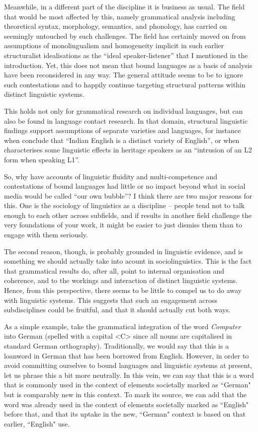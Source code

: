Meanwhile, in a different part of the discipline it is business as usual. The field that would be most affected by this, namely grammatical analysis including theoretical syntax, morphology, semantics, and phonology, has carried on seemingly untouched by such challenges. The field has certainly moved on from assumptions of monolingualism and homogeneity implicit in such earlier structuralist idealisations as the “ideal speaker-listener” that I mentioned in the introduction. Yet, this does not mean that bound languages as a basis of analysis have been reconsidered in any way. The general attitude seems to be to ignore such contestations and to happily continue targeting structural patterns within distinct linguistic systems.

This holds not only for grammatical research on individual languages, but can also be found in language contact research. In that domain, structural linguistic findings support assumptions of separate varieties and languages, for instance when \citet[2]{PagePutnam2020} conclude that “Indian English is a distinct variety of English”, or when \citet[8]{MacWhinney2019} characterises some linguistic effects in heritage speakers as an “intrusion of an L2 form when speaking L1”.

So, why have accounts of linguistic fluidity and multi-competence and contestations of bound languages had little or no impact beyond what in social media would be called “our own bubble”? I think there are two major reasons for this. One is the sociology of linguistics as a discipline –  people tend not to talk enough to each other across subfields, and if results in another field challenge the very foundations of your work, it might be easier to just dismiss them than to engage with them seriously.

The second reason, though, is probably grounded in linguistic evidence, and is something we should actually take into acount in sociolinguistics. This is the fact that grammatical results do, after all, point to internal organisation and coherence, and to the workings and interaction of distinct linguistic systems. Hence, from this perspective, there seems to be little to compel us to do away with linguistic systems. This suggests that such an engagement across subdisciplines could be fruitful, and that it should actually cut both ways.

As a simple example, take the grammatical integration of the word \textit{Computer} into German (spelled with a capital <C> since all nouns are capitalised in standard German orthography). Traditionally, we would say that this is a loanword in German that has been borrowed from English. However, in order to avoid committing ourselves to bound languages and linguistic systems at present, let us phrase this a bit more neutrally. In this vein, we can say that this is a word that is commonly used in the context of elements societally marked as “German" but is comparably new in this context. To mark its source, we can add that the word was already used in the context of elements societally marked as “English" before that, and that its uptake in the new, “German" context is based on that earlier, “English" use.


